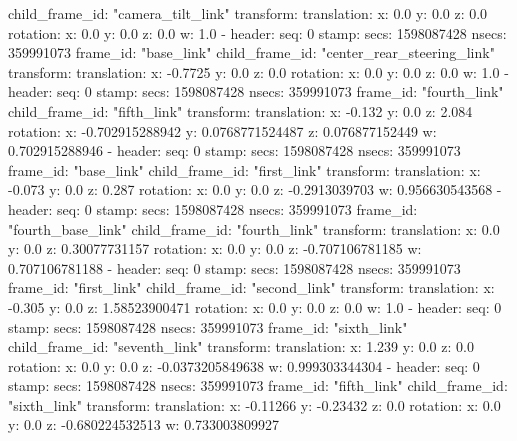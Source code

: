     child_frame_id: "camera_tilt_link"
    transform: 
      translation: 
        x: 0.0
        y: 0.0
        z: 0.0
      rotation: 
        x: 0.0
        y: 0.0
        z: 0.0
        w: 1.0
  - 
    header: 
      seq: 0
      stamp: 
        secs: 1598087428
        nsecs: 359991073
      frame_id: "base_link"
    child_frame_id: "center_rear_steering_link"
    transform: 
      translation: 
        x: -0.7725
        y: 0.0
        z: 0.0
      rotation: 
        x: 0.0
        y: 0.0
        z: 0.0
        w: 1.0
  - 
    header: 
      seq: 0
      stamp: 
        secs: 1598087428
        nsecs: 359991073
      frame_id: "fourth_link"
    child_frame_id: "fifth_link"
    transform: 
      translation: 
        x: -0.132
        y: 0.0
        z: 2.084
      rotation: 
        x: -0.702915288942
        y: 0.0768771524487
        z: 0.076877152449
        w: 0.702915288946
  - 
    header: 
      seq: 0
      stamp: 
        secs: 1598087428
        nsecs: 359991073
      frame_id: "base_link"
    child_frame_id: "first_link"
    transform: 
      translation: 
        x: -0.073
        y: 0.0
        z: 0.287
      rotation: 
        x: 0.0
        y: 0.0
        z: -0.2913039703
        w: 0.956630543568
  - 
    header: 
      seq: 0
      stamp: 
        secs: 1598087428
        nsecs: 359991073
      frame_id: "fourth_base_link"
    child_frame_id: "fourth_link"
    transform: 
      translation: 
        x: 0.0
        y: 0.0
        z: 0.30077731157
      rotation: 
        x: 0.0
        y: 0.0
        z: -0.707106781185
        w: 0.707106781188
  - 
    header: 
      seq: 0
      stamp: 
        secs: 1598087428
        nsecs: 359991073
      frame_id: "first_link"
    child_frame_id: "second_link"
    transform: 
      translation: 
        x: -0.305
        y: 0.0
        z: 1.58523900471
      rotation: 
        x: 0.0
        y: 0.0
        z: 0.0
        w: 1.0
  - 
    header: 
      seq: 0
      stamp: 
        secs: 1598087428
        nsecs: 359991073
      frame_id: "sixth_link"
    child_frame_id: "seventh_link"
    transform: 
      translation: 
        x: 1.239
        y: 0.0
        z: 0.0
      rotation: 
        x: 0.0
        y: 0.0
        z: -0.0373205849638
        w: 0.999303344304
  - 
    header: 
      seq: 0
      stamp: 
        secs: 1598087428
        nsecs: 359991073
      frame_id: "fifth_link"
    child_frame_id: "sixth_link"
    transform: 
      translation: 
        x: -0.11266
        y: -0.23432
        z: 0.0
      rotation: 
        x: 0.0
        y: 0.0
        z: -0.680224532513
        w: 0.733003809927
